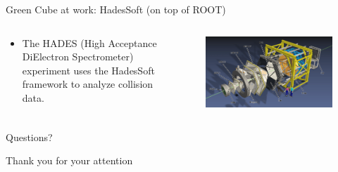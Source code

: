 \begin{frame}[fragile]{Green Cube at work: HadesSoft (on top of ROOT)}
    \begin{columns}
        \begin{column}{0.4\textwidth}
            \begin{itemize}
                \item The HADES (High Acceptance DiElectron Spectrometer) experiment uses the HadesSoft framework to analyze
                      collision data.
            \end{itemize}
        \end{column}
        \begin{column}{0.6\textwidth}
            \begin{figure}
                \centering
                \includegraphics[width=\textwidth]{images/HADES_detectors.png}
            \end{figure}
        \end{column}
    \end{columns}
\end{frame}

\begin{frame}{}
    \centering
    \Large{Questions?}
\end{frame}


\begin{frame}{}
    \centering
    \Large{Thank you for your attention}
\end{frame}




